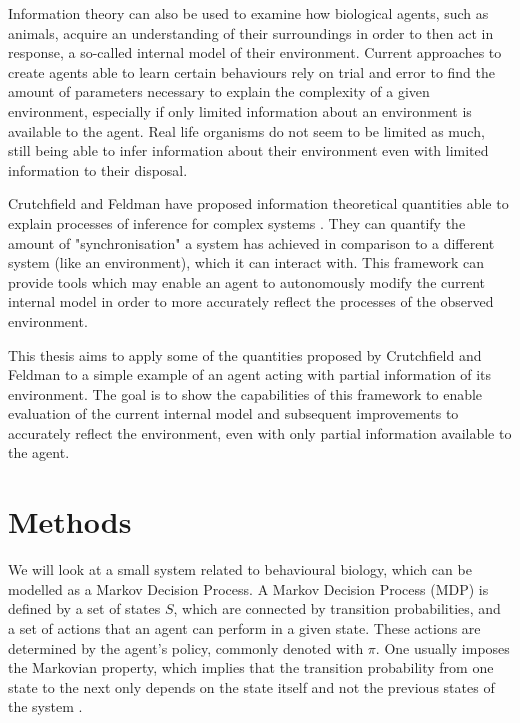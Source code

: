 \documentclass[12pt,a4paper]{article}
\begin{document}
Information theory can also be used to examine how biological agents, such as animals, acquire an understanding of their surroundings in order to then act in response, a so-called internal model of their environment.
Current approaches to create agents able to learn certain behaviours rely on trial and error to find the amount of parameters necessary to explain the complexity of a given environment, especially if only limited information about an environment is available to the agent.
Real life organisms do not seem to be limited as much, still being able to infer information about their environment even with limited information to their disposal.

Crutchfield and Feldman have proposed information theoretical quantities able to explain processes of inference for complex systems \autocite{crutchfield2003regularities}.
They can quantify the amount of "synchronisation" a system has achieved in comparison to a different system (like an environment), which it can interact with.
This framework can provide tools which may enable an agent to autonomously modify the current internal model in order to more accurately reflect the processes of the observed environment.

This thesis aims to apply some of the quantities proposed by Crutchfield and Feldman to a simple example of an agent acting with partial information of its environment.
The goal is to show the capabilities of this framework to enable evaluation of the current internal model and subsequent improvements to accurately reflect the environment, even with only partial information available to the agent.


\newpage
\section{Methods} \label{sec:methods}

We will look at a small system related to behavioural biology, which can be modelled as a Markov Decision Process.
A Markov Decision Process (MDP) \autocite{bellman1957MDP} is defined by a set of states $S$, which are connected by transition probabilities, and a set of actions that an agent can perform in a given state.
These actions are determined by the agent's policy, commonly denoted with $\pi$.
One usually imposes the Markovian property, which implies that the transition probability from one state to the next only depends on the state itself and not the previous states of the system \autocite{cover1999elements}.
\end{document}
